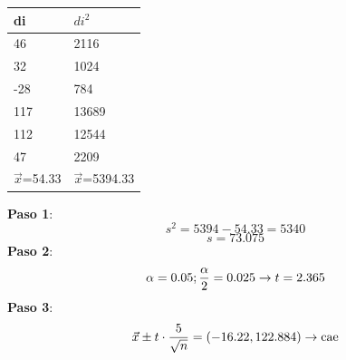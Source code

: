 \begin{tcolorbox}[colback=white,colframe=cyan!50!black,fonttitle=\bfseries]
\begin{table}[H]
\centering
\begin{tabular}{|l|l|}
\hline
\textbf{di} & \textbf{$di^2$} \\ \hline
46          & 2116         \\ \hline
32          & 1024         \\ \hline
-28         & 784          \\ \hline
117         & 13689        \\ \hline
112         & 12544        \\ \hline
47          & 2209         \\ \hline
$\Vec{x}$=54.33     & $\Vec{x}$=5394.33    \\ \hline
\end{tabular}
\end{table}
\noindent
\textbf{Paso 1}:
\[
s^2=5394-54.33=5340
\]
\[
s=73.075
\]
\textbf{Paso 2}:
\[
\alpha=0.05; \dfrac{\alpha}{2}=0.025\rightarrow t=2.365
\]
\textbf{Paso 3}:
\[
\Vec{x}\pm t\cdot\dfrac{5}{\sqrt{n}}=(-16.22,122.884)\rightarrow\text{cae}
\]
\end{tcolorbox}















